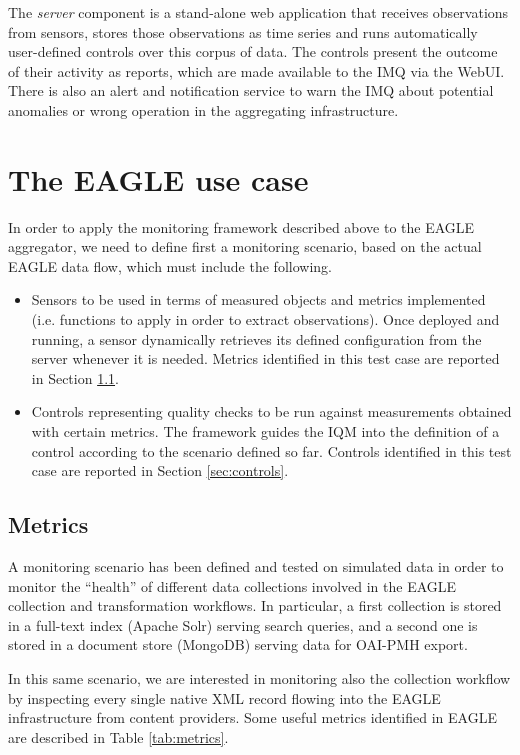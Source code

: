 \documentclass[amsthm,ebook]{saparticle}
\begin{document}
The \textit{server} component is a stand-alone web application that receives observations from sensors, stores those observations as time series and runs automatically user-defined controls over this corpus of data. The controls present the outcome of their activity as reports, which are made available to the IMQ via the WebUI. There is also an alert and notification service to warn the IMQ about potential anomalies or wrong operation in the aggregating infrastructure.


\section{The EAGLE use case}\label{usecase}

In order to apply the monitoring framework described above to the EAGLE aggregator, we need to define first a monitoring scenario, based on the actual EAGLE data flow, which must include the following. 
\begin{itemize}
\item Sensors to be used in terms of measured objects and metrics implemented (i.e. functions to apply in order to extract observations). Once deployed and running, a sensor dynamically retrieves its defined configuration from the server whenever it is needed. Metrics identified in this test case are reported in Section \ref{sec:metrics}.
\item Controls representing quality checks to be run against measurements obtained with certain metrics. The framework guides the IQM into the definition of a control according to the scenario defined so far. Controls identified in this test case are reported in Section \ref{sec:controls}.
\end{itemize}


\subsection{Metrics}\label{sec:metrics}

A monitoring scenario has been defined and tested on simulated data in order to monitor the ``health'' of different data collections involved in the EAGLE collection and transformation workflows. In particular, a first collection is stored in a full-text index (Apache Solr) serving search queries, and a second one is stored in a document store (MongoDB) serving data for OAI-PMH export.

In this same scenario, we are interested in monitoring also the collection workflow by inspecting every single native XML record flowing into the EAGLE infrastructure from content providers. Some useful metrics identified in EAGLE are described in Table \ref{tab:metrics}.
\end{document}
